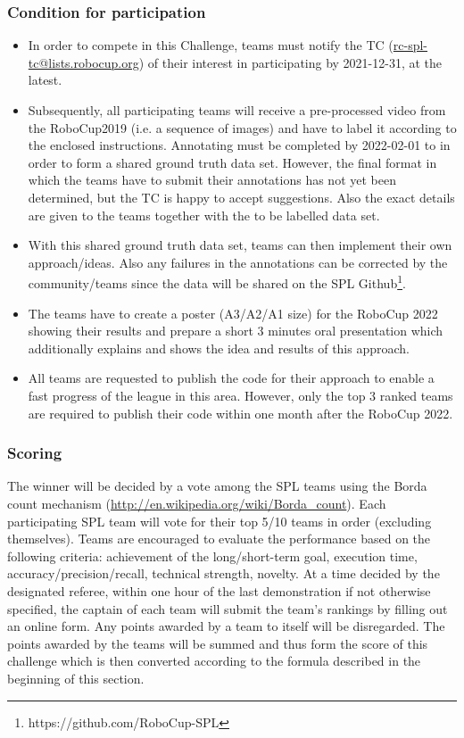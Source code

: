     \subsubsection{Condition for participation}
    \begin{itemize}
    \item In order to compete in this Challenge, teams must notify the TC (\url{rc-spl-tc@lists.robocup.org}) of their interest in participating by 2021-12-31, at the latest.
    \item Subsequently, all participating teams will receive a pre-processed video from the RoboCup2019 (i.e. a sequence of images) and have to label it according to the enclosed instructions. Annotating must be completed by 2022-02-01 to in order to form a shared ground truth data set. However, the final format in which the teams have to submit their annotations has not yet been determined, but the TC is happy to accept suggestions. Also the exact details are given to the teams together with the to be labelled data set.
    \item With this shared ground truth data set, teams can then implement their own approach/ideas. Also any failures in the annotations can be corrected by the community/teams since the data will be shared on the SPL Github\footnote{https://github.com/RoboCup-SPL}.
    \item The teams have to create a poster (A3/A2/A1 size) for the RoboCup 2022 showing their results and prepare a short 3 minutes oral presentation which additionally explains and shows the idea and results of this approach.
    \item All teams are requested to publish the code for their approach to enable a fast progress of the league in this area. However, only the top 3 ranked teams are required to publish their code within one month after the RoboCup 2022.
    \end{itemize}

    \subsubsection{Scoring}
    The winner will be decided by a vote among the SPL teams using the Borda count mechanism (\url{http://en.wikipedia.org/wiki/Borda_count}). Each participating SPL team will vote for their top 5/10 teams in order (excluding themselves). Teams are encouraged to evaluate the performance based on the following criteria: achievement of the long/short-term goal, execution time, accuracy/precision/recall, technical strength, novelty. At a time decided by the designated referee, within one hour of the last demonstration if not otherwise specified, the captain of each team will submit the team's rankings by filling out an online form. Any points awarded by a team to itself will be disregarded. The points awarded by the teams will be summed and thus form the score of this challenge which is then converted according to the formula described in the beginning of this section.

